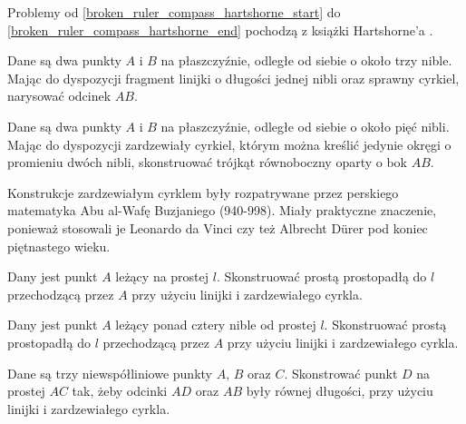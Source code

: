 %

Problemy od \ref{broken_ruler_compass_hartshorne_start} do \ref{broken_ruler_compass_hartshorne_end} pochodzą z książki Hartshorne'a \cite[s. 25, 26]{hartshorne2000}.

\begin{geoconstruction}
\label{broken_ruler_compass_hartshorne_start}%
%
    Dane są dwa punkty $A$ i $B$ na płaszczyźnie, odległe od siebie o około trzy nible.
    Mając do dyspozycji fragment linijki o długości jednej nibli oraz sprawny cyrkiel, narysować odcinek $AB$.
\end{geoconstruction}

\begin{geoconstruction}
    Dane są dwa punkty $A$ i $B$ na płaszczyźnie, odległe od siebie o około pięć nibli.
    Mając do dyspozycji zardzewiały cyrkiel, którym można kreślić jedynie okręgi o promieniu dwóch nibli, skonstruować trójkąt równoboczny oparty o bok $AB$.
\end{geoconstruction}

Konstrukcje zardzewiałym cyrklem były rozpatrywane przez perskiego matematyka Abu al-Wafę Buzjaniego (940-998).
%
Miały praktyczne znaczenie, ponieważ stosowali je Leonardo da Vinci czy też Albrecht Dürer pod koniec piętnastego wieku.
%
%

\begin{geoconstruction}
    Dany jest punkt $A$ leżący na prostej $l$.
    Skonstruować prostą prostopadłą do $l$ przechodzącą przez $A$ przy użyciu linijki i zardzewiałego cyrkla.
\end{geoconstruction}

\begin{geoconstruction}
    Dany jest punkt $A$ leżący ponad cztery nible od prostej $l$.
    Skonstruować prostą prostopadłą do $l$ przechodzącą przez $A$ przy użyciu linijki i zardzewiałego cyrkla.
\end{geoconstruction}

\begin{geoconstruction}
    Dane są trzy niewspółliniowe punkty $A$, $B$ oraz $C$.
    Skonstrować punkt $D$ na prostej $AC$ tak, żeby odcinki $AD$ oraz $AB$ były równej długości, przy użyciu linijki i zardzewiałego cyrkla.
\end{geoconstruction}

